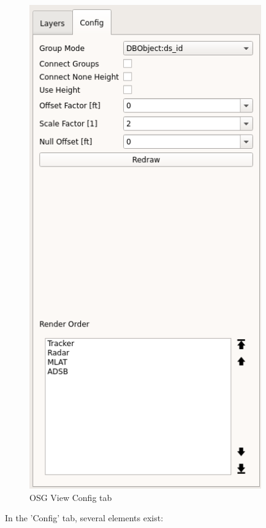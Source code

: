 \begin{figure}[H]
    \hspace*{-2cm}
    \includegraphics[width=10cm,frame]{../screenshots/osgview_config_tab.png}
  \caption{OSG View Config tab}
\end{figure}


In the 'Config' tab, several elements exist:

